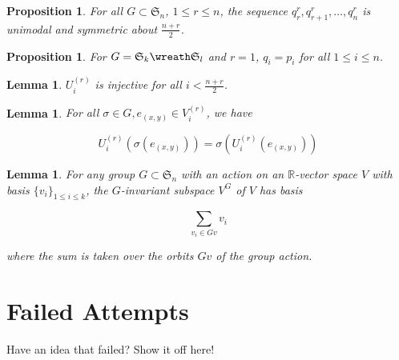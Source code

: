\documentclass[11pt]{amsart}
\newtheorem{lem}[thm]{Lemma}
\newtheorem{prop}[thm]{Proposition}
\theoremstyle{definition}
\begin{document}
\begin{prop}\label{prop:q_injective_unimodal}
For all $G\subset\mathfrak{S}_n$, $1\le r\le n$, the sequence $q_r^r, q_{r+1}^r,\ldots, q_n^r$ is unimodal and symmetric about $\frac{n+r}{2}$.
\end{prop}

\begin{prop}\label{prop:pak_panova_comparison}
For $G = \mathfrak{S}_k \wreath \mathfrak{S}_l$ and $r = 1$, $q_i = p_i$ for all $1\le i\le n$.
\end{prop}


\begin{lem}\label{lem:U_injective}
$U_i^{(r)}$ is injective for all $i < \frac{n + r}{2}$.
\end{lem}



\begin{lem}\label{lem:U_commutes_with_action}
For all $\sigma\in G, e_{(x,y)}\in V_i^{(r)}$, we have

$$U_i^{(r)}(\sigma(e_{(x,y)})) = \sigma(U_i^{(r)}(e_{(x,y)}))$$

\end{lem}


\begin{lem}\label{lem:G_invariant_basis}
For any group $G\subset \mathfrak{S}_n$ with an action on an $\mathbb{R}$-vector space $V$ with basis $\{v_i\}_{1\le i\le k}$, the $G$-invariant subspace $V^G$ of $V$ has basis

$$\sum_{v_i\in Gv} v_i $$

\noindent where the sum is taken over the orbits $Gv$ of the group action.
\end{lem}



\section{Failed Attempts}
Have an idea that failed?  Show it off here!
\end{document}

